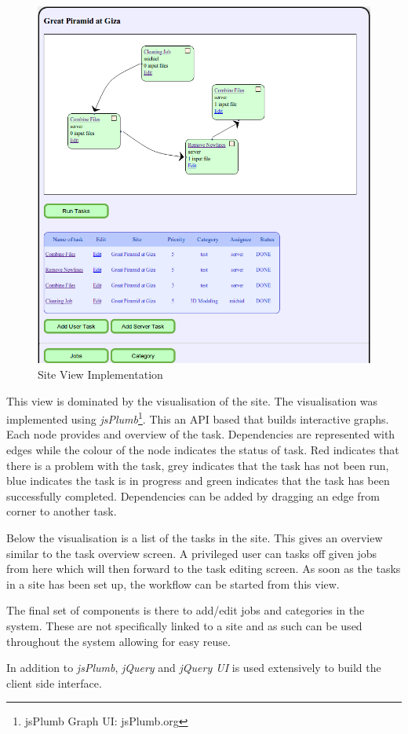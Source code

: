 \documentclass[12pt,a4paper]{report}
\begin{document}
\begin{description}
\begin{figure}[!h]
\begin{center}
            \includegraphics[scale=0.35]{figures/site_view_impl2.png}
        \end{center}
        \caption{Site View Implementation}
        \label{site_view_impl2}
    \end{figure}
    This view is dominated by the visualisation of the site. The visualisation was implemented using
    \emph{jsPlumb}\footnote{jsPlumb Graph UI: jsPlumb.org}. This an API based that builds interactive
    graphs. Each node provides and overview of the task. Dependencies are represented with edges
    while the colour of the node indicates the status of task. Red indicates that there is a
    problem with the task, grey indicates that the task has not been run, blue indicates the
    task is in progress and green indicates that the task has been successfully completed. Dependencies
    can be added by dragging an edge from corner to another task.

    Below the visualisation is a list of the tasks in the site. This gives an overview
    similar to the task overview screen. A privileged user can tasks off given jobs
    from here which will then forward to the task editing screen.
    As soon as the tasks in a site has been set up, the workflow can be started from this view.

    The final set of components is there to add/edit jobs and categories in the system. These
    are not specifically linked to a site and as such can be used throughout the system allowing
    for easy reuse.

\end{description}
In addition to \emph{jsPlumb}, \emph{jQuery} and \emph{jQuery UI} is used extensively to build
the client side interface.
\end{document}

